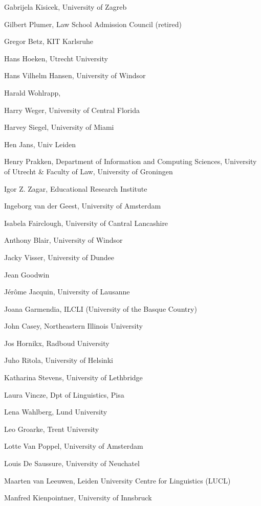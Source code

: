 \begin{compactitem}[]
		\item[] Gabrijela Kisicek, University of Zagreb
		\item[] Gilbert Plumer, Law School Admission Council (retired)
		\item[] Gregor Betz, KIT Karlsruhe
		\item[] Hans Hoeken, Utrecht University
		\item[] Hans Vilhelm Hansen, University of Windsor
		\item[] Harald Wohlrapp,
		\item[] Harry Weger, University of Central Florida
		\item[] Harvey Siegel, University of Miami
		\item[] Hen Jans, Univ Leiden
		\item[] Henry Prakken, Department of Information and Computing Sciences, University of Utrecht \& Faculty of Law, University of Groningen
		\item[] Igor Z. Zagar, Educational Research Institute
		\item[] Ingeborg van der Geest, University of Amsterdam
		\item[] Isabela Fairclough, University of Cantral Lancashire
		\item[] Anthony Blair, University of Windsor
		\item[] Jacky Visser, University of Dundee
		\item[] Jean Goodwin
		\item[] Jérôme Jacquin, University of Lausanne
		\item[] Joana Garmendia, ILCLI (University of the Basque Country)
		\item[] John Casey, Northeastern Illinois University
		\item[] Jos Hornikx, Radboud University
		\item[] Juho Ritola, University of Helsinki
		\item[] Katharina Stevens, University of Lethbridge
		\item[] Laura Vincze, Dpt of Linguistics, Pisa
		\item[] Lena Wahlberg, Lund University
		\item[] Leo Groarke, Trent University
		\item[] Lotte Van Poppel, University of Amsterdam
		\item[] Louis De Saussure, University of Neuchatel
		\item[] Maarten van Leeuwen, Leiden University Centre for Linguistics (LUCL)
		\item[] Manfred Kienpointner, University of Innsbruck

\end{compactitem}
